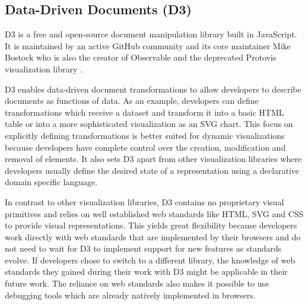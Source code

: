 \subsection{Data-Driven Documents (D3)}

D3 \parencite{D3} is a free and open-source document manipulation
library built in JavaScript.  It is maintained by an active GitHub
community and its core maintainer Mike Bostock who is also the creator
of Observable \parencite{Observable} and the deprecated Protovis
visualization library \parencite{Protovis}.

D3 enables data-driven document transformations to allow developers to
describe documents as functions of data.  As an example, developers
can define transformations which receive a dataset and transform it
into a basic HTML table or into a more sophisticated visualization as
an SVG chart.  This focus on explicitly defining transformations is
better suited for dynamic visualizations because developers have
complete control over the creation, modification and removal of
elements.  It also sets D3 apart from other visualization libraries
where developers usually define the desired state of a representation
using a declarative domain specific language.

In contrast to other visualization libraries, D3 contains no
proprietary visual primitives and relies on well established web
standards like HTML, SVG and CSS to provide visual representations.
This yields great flexibility because developers work directly with
web standards that are implemented by their browsers and do not need
to wait for D3 to implement support for new features as standards
evolve.  If developers chose to switch to a different library, the
knowledge of web standards they gained during their work with D3 might
be applicable in their future work.  The reliance on web standards
also makes it possible to use debugging tools which are already
natively implemented in browsers.

